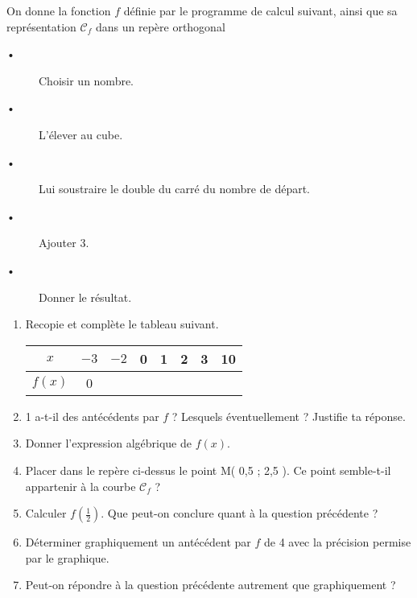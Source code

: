 
On donne la fonction $f$ définie par le programme de calcul suivant, ainsi que sa  représentation $\mathscr{C}_f$ dans un repère orthogonal 
\begin{description}
\item[•] Choisir un nombre.
\item[•]  L’élever au cube.
\item[•]  Lui soustraire le double du carré du nombre de départ.
\item[•]  Ajouter 3.
\item[•]  Donner le résultat.
\end{description}


\begin{center}
\end{center}


\begin{enumerate}
\item  Recopie et complète le tableau suivant.

\begin{tabular}{|c|c|c|c|c|c|c|c|}
\hline 
$x$ & $-3$ & $-2$ & 0 & 1 & 2 & 3 & 10 \\ 
\hline 
$f(x)$ & 0 &  &  &  &  &  &  \\ 
\hline 
\end{tabular} 
\item  1 a-t-il des antécédents par $f$ ? Lesquels éventuellement ? Justifie ta réponse.
\item  Donner l'expression algébrique de $f(x)$.
\item  Placer dans le repère ci-dessus le point M( 0,5 ; 2,5 ). Ce point semble-t-il appartenir à la courbe $\mathscr{C}_f$ ?
\item Calculer $f\left( \frac{1}{2} \right)$. Que peut-on conclure quant à la question précédente ?
\item Déterminer graphiquement un antécédent par $f$ de 4 avec la précision permise par le graphique.
\item Peut-on répondre à la question précédente autrement que graphiquement ?
\end{enumerate}